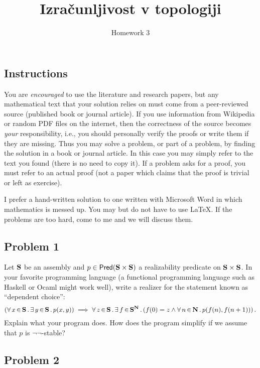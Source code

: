 \documentclass[a4paper,11pt]{article}
\begin{document}
\title{Izračunljivost v topologiji}
\author{Homework 3}
\date{}

\maketitle


\subsection*{Instructions}

You are \emph{encouraged} to use the literature and research papers,
but any mathematical text that your solution relies on must come from
a peer-reviewed source (published book or journal article).
%
If you use information from Wikipedia or random PDF files on the
internet, then the correctness of the source becomes \emph{your}
responsibility, i.e., you should personally verify the proofs or write
them if they are missing.
%
Thus you may solve a problem, or part of a problem, by finding the
solution in a book or journal article. In this case you may simply
refer to the text you found (there is no need to copy it). If a
problem asks for a proof, you must refer to an actual proof (not a
paper which claims that the proof is trivial or left as exercise).

I prefer a hand-written solution to one written with Microsoft Word in
which mathematics is messed up. You may but do not have to use
{\LaTeX}.
%
If the problems are too hard, come to me and we will discuss them.


\subsection*{Problem 1}

Let $\mathbf{S}$ be an assembly and $p \in \mathsf{Pred}(\mathbf{S} \times \mathbf{S})$
a realizability predicate on $\mathbf{S} \times \mathbf{S}$. In your
favorite programming language (a functional programming language such
as Haskell or Ocaml might work well), write a realizer for the
statement known as ``dependent choice'':
%
\begin{equation*}
  (\forall\, x \,{\in}\, \mathbf{S}\,.\,\exists\, y \,{\in}\, \mathbf{S}\,.\,p(x,y)) \implies
  \forall\, z \,{\in}\, \mathbf{S}\,.\,
    \exists\, f \,{\in}\, \mathbf{S}^{\mathbf{N}}\,.\left(
      f(0) = z \land \forall\, n \,{\in}\, \mathbf{N}\,.\,p(f(n), f(n+1))
    \right)
 .
\end{equation*}
%
Explain what your program does. How does the program simplify if we
assume that $p$ is $\lnot\lnot$-stable?


\subsection*{Problem 2}
\end{document}

